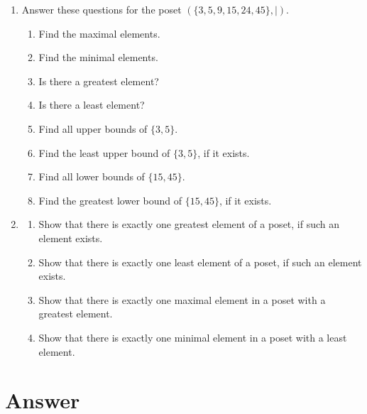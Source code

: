 \documentclass{sig-alternate-05-2015}
\begin{document}
\begin{enumerate}
\item Answer these questions for the poset $(\{3, 5, 9, 15,	24, 45\}, \mid)$.
\begin{enumerate}
	\item Find the maximal elements.
	\item Find the minimal elements.
	\item Is there a greatest element?
	\item Is there a least element?
	\item Find all upper bounds of $\{3, 5\}$.
	\item Find the least upper bound of $\{3, 5\}$, if it exists.
	\item Find all lower bounds of $\{15, 45\}$.
	\item Find the greatest lower bound of $\{15, 45\}$, if it exists.
\end{enumerate}

\item 
	\begin{enumerate}
		\item Show that there is exactly one greatest element of a
		poset, if such an element exists.
		\item Show that there is exactly one least element of a poset,
		if such an element exists.
		\item Show that there is exactly one maximal element in a
		poset with a greatest element.
		\item Show that there is exactly one minimal element in a
		poset with a least element.
	\end{enumerate}
\end{enumerate}

\nocite{*}

 
\clearpage
\appendix
\section{Answer}
\end{document}
